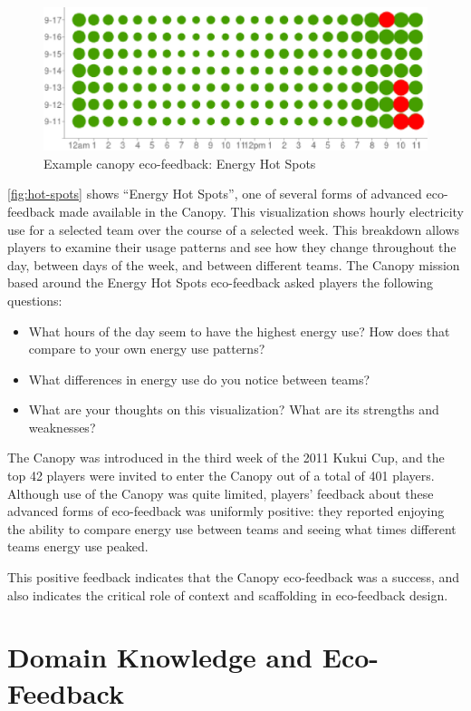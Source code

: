 \documentclass{sigchi}
\begin{document}
\begin{figure}[!tb]
	\centering
	\includegraphics[width=0.95\columnwidth]{hot-spots-crop2.eps}
	\caption{Example canopy eco-feedback: Energy Hot Spots}
	\label{fig:hot-spots}
\end{figure}

\autoref{fig:hot-spots} shows ``Energy Hot Spots'', one of several forms of advanced eco-feedback made available in the Canopy. This visualization shows hourly electricity use for a selected team over the course of a selected week. This breakdown allows players to examine their usage patterns and see how they change throughout the day, between days of the week, and between different teams. The Canopy mission based around the Energy Hot Spots eco-feedback asked players the following questions:

\begin{itemize}
	\item What hours of the day seem to have the highest energy use? How does that compare to your own energy use patterns?
	\item What differences in energy use do you notice between teams?
	\item What are your thoughts on this visualization? What are its strengths and weaknesses?
\end{itemize}

The Canopy was introduced in the third week of the 2011 Kukui Cup, and the top 42 players were invited to enter the Canopy out of a total of 401 players. Although use of the Canopy was quite limited, players' feedback about these advanced forms of eco-feedback was uniformly positive: they reported enjoying the ability to compare energy use between teams and seeing what times different teams energy use peaked. 

This positive feedback indicates that the Canopy eco-feedback was a success, and also indicates the critical role of context and scaffolding in eco-feedback design. 


\section{Domain Knowledge and Eco-Feedback}
\end{document}
